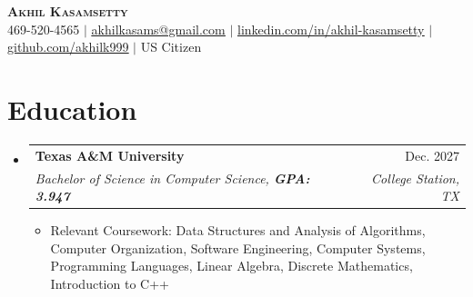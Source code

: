 \documentclass[letterpaper,11pt]{article}
\makeatletter
\newcommand{\resumeEducation}[6]{
  \vspace{-2pt}\item
    \begin{tabular*}{0.97\textwidth}[t]{l@{\extracolsep{\fill}}r}
      \textbf{#1} & #2 \\
      \textit{\small#3} & \textit{\small #4} \\
    \end{tabular*}
        \textbf{\small#5:} {\small#6} \\
}
\newcommand{\resumeItem}[1]{
  \item\small{
    {#1 \vspace{-2pt}}
  }
}
\newcommand{\resumeSubheading}[4]{
  \vspace{-2pt}\item
    \begin{tabular*}{0.97\textwidth}[t]{l@{\extracolsep{\fill}}r}
      \textbf{#1} & #2 \\
      \textit{\small#3} & \textit{\small #4} \\
    \end{tabular*}\vspace{-7pt}
}
\newcommand{\resumeSubHeadingListStart}{\begin{itemize}[leftmargin=0.15in, label={}]}
\newcommand{\resumeSubHeadingListEnd}{\end{itemize}}
\newcommand{\resumeItemListStart}{\begin{itemize}}
\newcommand{\resumeItemListEnd}{\end{itemize}\vspace{-5pt}}
\makeatother
\begin{document}

\begin{center}
    \textbf{\huge \scshape Akhil Kasamsetty} \\ \vspace{1pt}
    \small 469-520-4565 $|$ \href{mailto:akhilkasams@gmail.com}{\underline{akhilkasams@gmail.com}} $|$ 
    \href{https://linkedin.com/in/akhil-kasamsetty}{\underline{linkedin.com/in/akhil-kasamsetty}} $|$
    \href{https://github.com/akhilk999}{\underline{github.com/akhilk999}} $|$ \small US Citizen
\end{center}



\section{Education}
  \resumeSubHeadingListStart
    \resumeSubheading
      {Texas A\&M University}{Dec. 2027}
      {Bachelor of Science in Computer Science, \textbf{GPA: 3.947}}{College Station, TX}
      \resumeItemListStart
        \resumeItem{Relevant Coursework: Data Structures and Analysis of Algorithms, Computer Organization, Software Engineering, Computer Systems, Programming Languages, Linear Algebra, Discrete Mathematics, Introduction to C++}
      \resumeItemListEnd
  \resumeSubHeadingListEnd


\end{document}

